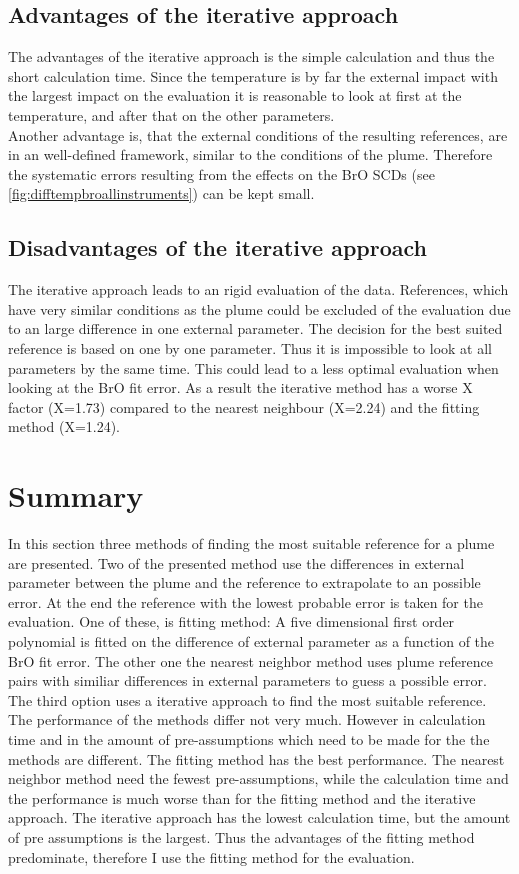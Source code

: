 \documentclass  [
  paper    = a4,
  BCOR     = 10mm,
  twoside,
  fontsize = 12pt,
  fleqn,
  toc      = bibnumbered,
  toc      = listofnumbered,
  numbers  = noendperiod,
  headings = normal,
  listof   = leveldown,
  version  = 3.03
]                                       {scrreprt}
\begin{document}
	\subsection*{Advantages of the iterative approach}
	The advantages of the iterative approach is the simple calculation and thus the short calculation time. Since the temperature is by far the external impact with the largest impact on the evaluation it is reasonable to look at first at the temperature, and after that on the other parameters. \\
	Another advantage is, that the external conditions of the resulting references, are in an well-defined framework, similar to the  conditions of the plume. Therefore the systematic errors resulting from the effects on the BrO SCDs (see \cref{fig:difftempbroallinstruments}) can be kept small.
	\subsection*{Disadvantages of the iterative approach}
	The iterative approach leads to an rigid evaluation of the data. References, which have very similar conditions as the plume could be excluded of the evaluation due to an large difference in one external parameter. The decision for the best suited reference is based on one by one parameter. Thus it is impossible to look at all parameters by the same time.   This could lead to a less optimal evaluation when looking at the BrO fit error.
	As a result the iterative method has a worse X factor (X=1.73) compared to the nearest neighbour (X=2.24) and the fitting method (X=1.24).
	
	
\section*{Summary}	
In this section three methods of finding the most suitable reference for a plume are presented.
Two of the presented method use the differences in external parameter between the plume and the reference to extrapolate to an possible error. At the end the reference with the lowest probable error is taken for the evaluation. One of these, is fitting method: A five dimensional first order polynomial is fitted on the difference of external parameter as a function of the BrO fit error. The other one the nearest neighbor method uses plume reference pairs with similiar differences in external parameters to guess a possible error. The third option uses a iterative approach to find the most suitable reference. The performance of the methods differ not very much. However in calculation time and in the amount of pre-assumptions which need to be made for the the methods are different. The fitting method has the best performance. The nearest neighbor method need the fewest pre-assumptions, while the calculation time and the performance is much worse than for the fitting method and the iterative approach. The iterative approach has the lowest calculation time, but the amount of pre assumptions is the largest. Thus the advantages of the fitting method predominate, therefore I use the fitting method for the evaluation.
\end{document}
